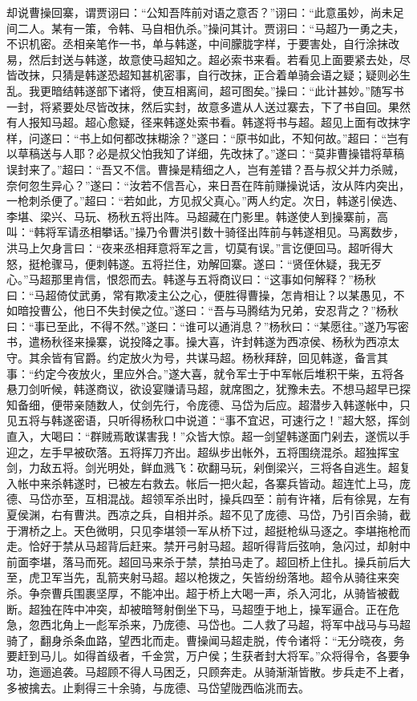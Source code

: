 却说曹操回寨，谓贾诩曰：“公知吾阵前对语之意否？”诩曰：“此意虽妙，尚未足间二人。某有一策，令韩、马自相仇杀。”操问其计。贾诩曰：“马超乃一勇之夫，不识机密。丞相亲笔作一书，单与韩遂，中间朦胧字样，于要害处，自行涂抹改易，然后封送与韩遂，故意使马超知之。超必索书来看。若看见上面要紧去处，尽皆改抹，只猜是韩遂恐超知甚机密事，自行改抹，正合着单骑会语之疑；疑则必生乱。我更暗结韩遂部下诸将，使互相离间，超可图矣。”操曰：“此计甚妙。”随写书一封，将紧要处尽皆改抹，然后实封，故意多遣从人送过寨去，下了书自回。果然有人报知马超。超心愈疑，径来韩遂处索书看。韩遂将书与超。超见上面有改抹字样，问遂曰：“书上如何都改抹糊涂？”遂曰：“原书如此，不知何故。”超曰：“岂有以草稿送与人耶？必是叔父怕我知了详细，先改抹了。”遂曰：“莫非曹操错将草稿误封来了。”超曰：“吾又不信。曹操是精细之人，岂有差错？吾与叔父并力杀贼，奈何忽生异心？”遂曰：“汝若不信吾心，来日吾在阵前赚操说话，汝从阵内突出，一枪刺杀便了。”超曰：“若如此，方见叔父真心。”两人约定。次日，韩遂引侯选、李堪、梁兴、马玩、杨秋五将出阵。马超藏在门影里。韩遂使人到操寨前，高叫：“韩将军请丞相攀话。”操乃令曹洪引数十骑径出阵前与韩遂相见。马离数步，洪马上欠身言曰：“夜来丞相拜意将军之言，切莫有误。”言讫便回马。超听得大怒，挺枪骤马，便刺韩遂。五将拦住，劝解回寨。遂曰：“贤侄休疑，我无歹心。”马超那里肯信，恨怨而去。韩遂与五将商议曰：“这事如何解释？”杨秋曰：“马超倚仗武勇，常有欺凌主公之心，便胜得曹操，怎肯相让？以某愚见，不如暗投曹公，他日不失封侯之位。”遂曰：“吾与马腾结为兄弟，安忍背之？”杨秋曰：“事已至此，不得不然。”遂曰：“谁可以通消息？”杨秋曰：“某愿往。”遂乃写密书，遣杨秋径来操寨，说投降之事。操大喜，许封韩遂为西凉侯、杨秋为西凉太守。其余皆有官爵。约定放火为号，共谋马超。杨秋拜辞，回见韩遂，备言其事：“约定今夜放火，里应外合。”遂大喜，就令军士于中军帐后堆积干柴，五将各悬刀剑听候，韩遂商议，欲设宴赚请马超，就席图之，犹豫未去。不想马超早已探知备细，便带亲随数人，仗剑先行，令庞德、马岱为后应。超潜步入韩遂帐中，只见五将与韩遂密语，只听得杨秋口中说道：“事不宜迟，可速行之！”超大怒，挥剑直入，大喝曰：“群贼焉敢谋害我！”众皆大惊。超一剑望韩遂面门剁去，遂慌以手迎之，左手早被砍落。五将挥刀齐出。超纵步出帐外，五将围绕混杀。超独挥宝剑，力敌五将。剑光明处，鲜血溅飞：砍翻马玩，剁倒梁兴，三将各自逃生。超复入帐中来杀韩遂时，已被左右救去。帐后一把火起，各寨兵皆动。超连忙上马，庞德、马岱亦至，互相混战。超领军杀出时，操兵四至：前有许褚，后有徐晃，左有夏侯渊，右有曹洪。西凉之兵，自相并杀。超不见了庞德、马岱，乃引百余骑，截于渭桥之上。天色微明，只见李堪领一军从桥下过，超挺枪纵马逐之。李堪拖枪而走。恰好于禁从马超背后赶来。禁开弓射马超。超听得背后弦响，急闪过，却射中前面李堪，落马而死。超回马来杀于禁，禁拍马走了。超回桥上住扎。操兵前后大至，虎卫军当先，乱箭夹射马超。超以枪拨之，矢皆纷纷落地。超令从骑往来突杀。争奈曹兵围裹坚厚，不能冲出。超于桥上大喝一声，杀入河北，从骑皆被截断。超独在阵中冲突，却被暗弩射倒坐下马，马超堕于地上，操军逼合。正在危急，忽西北角上一彪军杀来，乃庞德、马岱也。二人救了马超，将军中战马与马超骑了，翻身杀条血路，望西北而走。曹操闻马超走脱，传令诸将：“无分晓夜，务要赶到马儿。如得首级者，千金赏，万户侯；生获者封大将军。”众将得令，各要争功，迤逦追袭。马超顾不得人马困乏，只顾奔走。从骑渐渐皆散。步兵走不上者，多被擒去。止剩得三十余骑，与庞德、马岱望陇西临洮而去。

